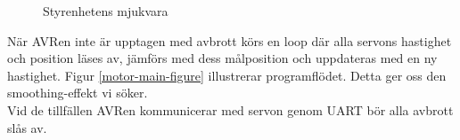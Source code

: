 \begin{figure}
\centering
\begin{minipage}[b]{.5\linewidth}
\centering
\scalebox{0.7}{}
\label{designspec:motor-interrupt-figure}
\end{minipage}%
\begin{minipage}[b]{.5\linewidth}
\centering
\scalebox{0.7}{}
\label{designspec:motor-main-figure}
\end{minipage}
\caption{Styrenhetens mjukvara}\label{fig:1}
\end{figure}

När AVRen inte är upptagen med avbrott körs en loop där alla servons hastighet och position läses av, jämförs med dess målposition och uppdateras med en ny hastighet. Figur \ref{motor-main-figure} illustrerar programflödet. Detta ger oss den smoothing-effekt vi söker. \\
Vid de tillfällen AVRen kommunicerar med servon genom UART bör alla avbrott slås av.  \\
